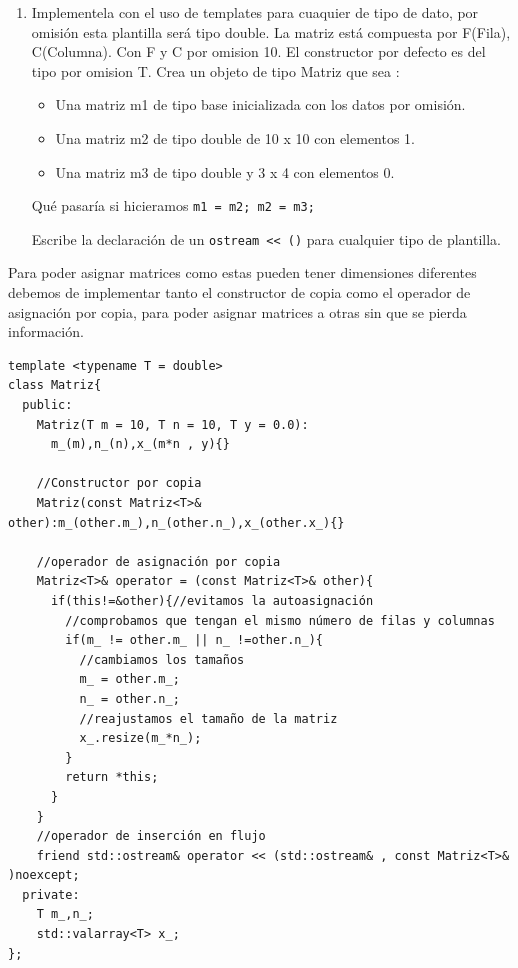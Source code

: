\begin{enumerate}
  \item Implementela con el uso de templates para cuaquier de tipo de dato, por omisión esta plantilla será tipo double. La matriz está compuesta por F(Fila), C(Columna). Con F y C por omision 10. El constructor por defecto es del tipo por omision T. Crea un objeto de tipo Matriz que sea :
  \begin{itemize}
    \item Una matriz m1 de tipo base inicializada con los datos por omisión.
    \item Una matriz m2 de tipo double de 10 x 10 con elementos 1.
    \item Una matriz m3 de tipo double y 3 x 4 con elementos 0.
  \end{itemize}
  Qué pasaría si hicieramos \texttt{m1 = m2; m2 = m3; }

  Escribe la declaración de un \texttt{ostream << ()} para cualquier tipo de plantilla.
\end{enumerate} 

Para poder asignar matrices como estas pueden tener dimensiones diferentes debemos de implementar tanto el constructor de copia como el operador de asignación por copia, para poder asignar matrices a otras sin que se pierda información.

\begin{verbatim}
template <typename T = double>
class Matriz{
  public:
    Matriz(T m = 10, T n = 10, T y = 0.0):
      m_(m),n_(n),x_(m*n , y){}
 
    //Constructor por copia
    Matriz(const Matriz<T>& other):m_(other.m_),n_(other.n_),x_(other.x_){}

    //operador de asignación por copia
    Matriz<T>& operator = (const Matriz<T>& other){
      if(this!=&other){//evitamos la autoasignación
        //comprobamos que tengan el mismo número de filas y columnas
        if(m_ != other.m_ || n_ !=other.n_){
          //cambiamos los tamaños
          m_ = other.m_;
          n_ = other.n_;
          //reajustamos el tamaño de la matriz
          x_.resize(m_*n_);
        }
        return *this;
      }
    }
    //operador de inserción en flujo
    friend std::ostream& operator << (std::ostream& , const Matriz<T>& )noexcept;
  private:
    T m_,n_;
    std::valarray<T> x_;
};

\end{verbatim}